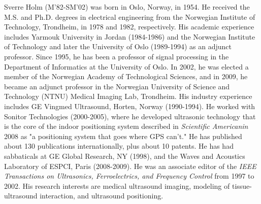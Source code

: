 \documentclass[journal]{IEEEtran}
\begin{document}
\begin{IEEEbiography}{Sverre Holm}
(M’82-SM’02) was born in Oslo, Norway, in 1954. He received the M.S. and Ph.D. degrees in electrical engineering from the Norwegian Institute of Technology, Trondheim, in 1978 and 1982, respectively. His academic experience includes Yarmouk University in Jordan (1984-1986) and the Norwegian Institute of Technology and later the University of Oslo (1989-1994) as an adjunct professor. Since 1995, he has been a professor of signal processing in the Department of Informatics at the University of Oslo. In 2002, he was elected a member of the Norwegian Academy of Technological Sciences, and in 2009, he became an adjunct professor in the Norwegian University of Science and Technology (NTNU) Medical Imaging Lab, Trondheim. His industry experience includes GE Vingmed Ultrasound, Horten, Norway (1990-1994). He worked with Sonitor Technologies (2000-2005), where he developed ultrasonic technology that is the core of the indoor positioning system described in \textit{Scientific Americanin} 2008 as "a positioning system that goes where GPS can't." He has published about 130 publications internationally, plus about 10 patents. He has had sabbaticals at GE Global Research, NY (1998), and the Waves and 
Acoustics Laboratory of ESPCI, Paris (2008-2009). He was an associate editor of the \textit{IEEE Transactions on Ultrasonics, Ferroelectrics, and Frequency Control} from 1997 to 2002. His research interests are medical ultrasound imaging, modeling of tissue-ultrasound interaction, and ultrasound positioning.
\end{IEEEbiography}







\end{document}
